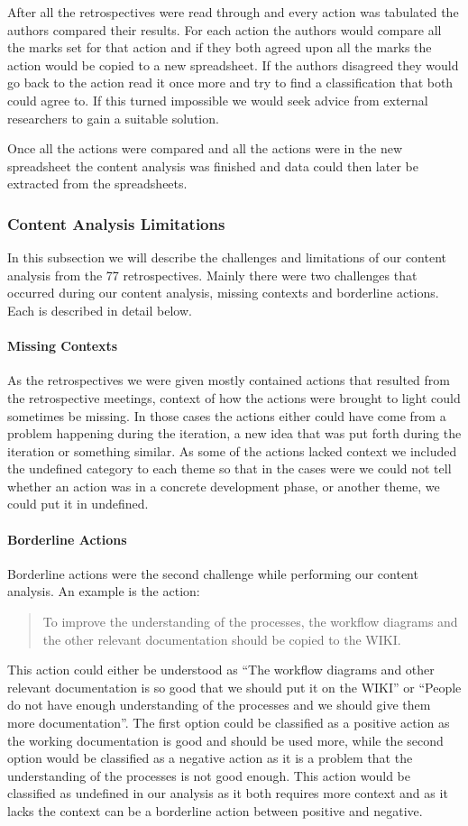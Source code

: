 After all the retrospectives were read through and every action was tabulated the authors compared their results. For each action the authors would compare all the marks set for that action and if they both agreed upon all the marks the action would be copied to a new spreadsheet. If the authors disagreed they would go back to the action read it once more and try to find a classification that both could agree to. If this turned impossible we would seek advice from external researchers to gain a suitable solution. 

Once all the actions were compared and all the actions were in the new spreadsheet the content analysis was finished and data could then later be extracted from the spreadsheets. 
\afterpage{\clearpage}
\subsubsection{Content Analysis Limitations}
In this subsection we will describe the challenges and limitations of our content analysis from the 77 retrospectives. Mainly there were two challenges that occurred during our content analysis, missing contexts and borderline actions. Each is described in detail below. 
\paragraph{Missing Contexts}
As the retrospectives we were given mostly contained actions that resulted from the retrospective meetings, context of how the actions were brought to light could sometimes be missing. In those cases the actions either could have come from a problem happening during the iteration, a new idea that was put forth during the iteration or something similar. As some of the actions lacked context we included the undefined category to each theme so that in the cases were we could not tell whether an action was in a concrete development phase, or another theme, we could put it in undefined. 
\paragraph{Borderline Actions}
Borderline actions were the second challenge while performing our content analysis. An example is the action: 
\begin{quote}
To improve the understanding of the processes, the workflow diagrams and the other relevant documentation should be copied to the WIKI.
\end{quote}
This action could either be understood as ``The workflow diagrams and other relevant documentation is so good that we should put it on the WIKI'' or ``People do not have enough understanding of the processes and we should give them more documentation''. The first option could be classified as a positive action as the working documentation is good and should be used more, while the second option would be classified as a negative action as it is a problem that the understanding of the processes is not good enough. This action would be classified as undefined in our analysis as it both requires more context and as it lacks the context can be a borderline action between positive and negative. 

